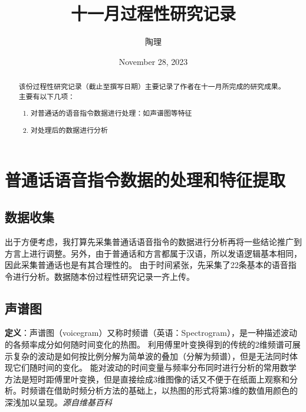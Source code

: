 \documentclass[lang=cn]{elegantpaper}
\title{十一月过程性研究记录}
\author{陶理}
\begin{document}
\date{November 28, 2023}
\maketitle

\begin{abstract}
    该份过程性研究记录（截止至撰写日期）主要记录了作者在十一月所完成的研究成果。主要有以下几项：
    \begin{enumerate}
        \item 对普通话的语音指令数据进行处理：如声谱图等特征
        \item 对处理后的数据进行分析
    \end{enumerate}
\end{abstract}

\section{普通话语音指令数据的处理和特征提取}
\subsection{数据收集}
出于方便考虑，我打算先采集普通话语音指令的数据进行分析再将一些结论推广到方言上进行调整。另外，由于普通话和方言都属于汉语，所以发语逻辑基本相同，因此采集普通话也是有其合理性的。
由于时间紧张，先采集了22条基本的语音指令进行分析。数据随本份过程性研究记录一齐上传。
\subsection{声谱图}
\textbf{定义}：声谱图（voicegram）又称时频谱（英语：Spectrogram），是一种描述波动的各频率成分如何随时间变化的热图。
利用傅里叶变换得到的传统的2维频谱可展示复杂的波动是如何按比例分解为简单波的叠加（分解为频谱），但是无法同时体现它们随时间的变化。
能对波动的时间变量与频率分布同时进行分析的常用数学方法是短时距傅里叶变换，但是直接绘成3维图像的话又不便于在纸面上观察和分析。时频谱在借助时频分析方法的基础上，以热图的形式将第3维的数值用颜色的深浅加以呈现。\textit{源自维基百科}
\end{document}
